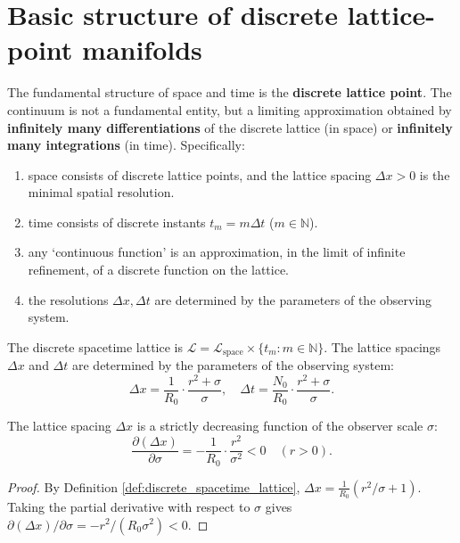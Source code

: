 \section{Basic structure of discrete lattice-point manifolds}\label{sec:discrete_lattice}

\begin{axiom}\label{axm:discreteness}
The fundamental structure of space and time is the \textbf{discrete lattice point}. The continuum is not a fundamental entity, but a limiting approximation obtained by \textbf{infinitely many differentiations} of the discrete lattice (in space) or \textbf{infinitely many integrations} (in time). Specifically:
\begin{enumerate}[label=(\roman*)]
    \item space consists of discrete lattice points, and the lattice spacing $\Delta x>0$ is the minimal spatial resolution.
    \item time consists of discrete instants $t_m=m\Delta t$ ($m\in\mathbb{N}$).
    \item any `continuous function' is an approximation, in the limit of infinite refinement, of a discrete function on the lattice.
    \item the resolutions $\Delta x,\Delta t$ are determined by the parameters of the observing system.
\end{enumerate}
\end{axiom}

\begin{definition}\label{def:discrete_spacetime_lattice}
The discrete spacetime lattice is $\mathcal{L}=\mathcal{L}_{\text{space}}\times\{t_m:m\in\mathbb{N}\}$. The lattice spacings $\Delta x$ and $\Delta t$ are determined by the parameters of the observing system:
\[
\Delta x=\frac{1}{R_0}\cdot\frac{r^2+\sigma}{\sigma},\quad \Delta t=\frac{N_0}{R_0}\cdot\frac{r^2+\sigma}{\sigma}.
\]
\end{definition}

\begin{proposition}\label{prop:lattice_spacing_observer}
The lattice spacing $\Delta x$ is a strictly decreasing function of the observer scale $\sigma$:
\[
\frac{\partial(\Delta x)}{\partial\sigma}=-\frac{1}{R_0}\cdot\frac{r^2}{\sigma^2}<0\quad(r>0).
\]
\end{proposition}

\begin{proof}
By Definition \ref{def:discrete_spacetime_lattice}, $\Delta x=\frac{1}{R_0}(r^2/\sigma+1)$. Taking the partial derivative with respect to $\sigma$ gives $\partial(\Delta x)/\partial\sigma=-r^2/(R_0\sigma^2)<0$.
\end{proof}

